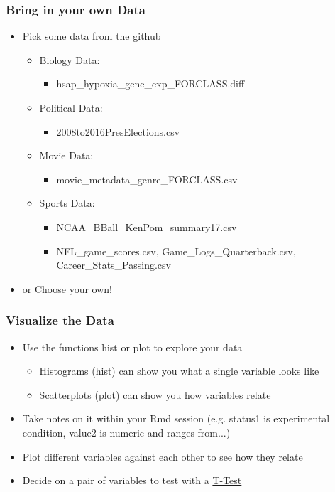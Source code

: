 \documentclass[14pt]{beamer}
\begin{document}
\begin{frame}
\frametitle{Bring in your own Data}
\begin{itemize}
	\item Pick some data from the github
	\begin{itemize}
		\item Biology Data:
		\begin{itemize}
			\item hsap\_hypoxia\_gene\_exp\_FORCLASS.diff
		\end{itemize}
		\item Political Data:
		\begin{itemize}
			\item 2008to2016PresElections.csv
		\end{itemize}
		\item Movie Data:
		\begin{itemize}
			\item movie\_metadata\_genre\_FORCLASS.csv
		\end{itemize}
		\item Sports Data: 
		\begin{itemize}
			\item NCAA\_BBall\_KenPom\_summary17.csv
			\item NFL\_game\_scores.csv, Game\_Logs\_Quarterback.csv, Career\_Stats\_Passing.csv
		\end{itemize}
	\end{itemize}
	\item or \href{https://www.kaggle.com/}{Choose your own!}
\end{itemize}
\end{frame}

\begin{frame}
\frametitle{Visualize the Data}
\begin{itemize}
	\item<+-> Use the functions hist or plot to explore your data
	\begin{itemize}
		\item<+-> Histograms (hist) can show you what a single variable looks like
		\item<+-> Scatterplots (plot) can show you how variables relate
	\end{itemize}
	\item<+-> Take notes on it within your Rmd session (e.g. status1 is experimental condition, value2 is numeric and ranges from...)
	\item<+-> Plot different variables against each other to see how they relate
	\item<+-> Decide on a pair of variables to test with a \href{https://en.wikipedia.org/wiki/T-test}{T-Test}
\end{itemize}
\end{frame}
\end{document}
